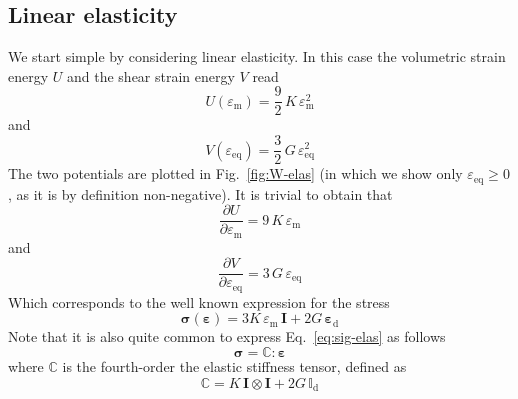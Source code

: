 \documentclass[times,namecite]{goose-article}
\begin{document}
\subsection{Linear elasticity}

We start simple by considering linear elasticity. In this case the volumetric strain energy $U$ and the shear strain energy $V$ read
\begin{equation}\label{eq:U}
  U ( \varepsilon_\mathrm{m}  ) = \frac{9}{2} \, K \, \varepsilon_\mathrm{m}^2
\end{equation}
and
\begin{equation}\label{eq:V-elas}
  V ( \varepsilon_\mathrm{eq} ) = \frac{3}{2} \, G \, \varepsilon_\mathrm{eq}^2
\end{equation}
The two potentials are plotted in Fig.~\ref{fig:W-elas} (in which we show only $\varepsilon_\mathrm{eq} \geq 0$, as it is by definition non-negative). It is trivial to obtain that
\begin{equation}
  \frac{\partial U}{\partial \varepsilon_\mathrm{m}}
  =
  9 \, K \, \varepsilon_\mathrm{m}
\end{equation}
and
\begin{equation}
  \frac{\partial V}{\partial \varepsilon_\mathrm{eq}}
  =
  3 \, G \, \varepsilon_\mathrm{eq}
\end{equation}
Which corresponds to the well known expression for the stress
\begin{equation}\label{eq:sig-elas}
  \bm{\sigma} ( \bm{\varepsilon} )
  =
  3 K \, \varepsilon_\mathrm{m} \, \bm{I}
  +
  2 G \, \bm{\varepsilon}_\mathrm{d}
\end{equation}
Note that it is also quite common to express Eq.~\eqref{eq:sig-elas} as follows
\begin{equation}
  \bm{\sigma} = \mathbb{C} : \bm{\varepsilon}
\end{equation}
where $\mathbb{C}$ is the fourth-order the elastic stiffness tensor, defined as
\begin{equation}
  \mathbb{C} = K \, \bm{I} \otimes \bm{I} + 2 G \, \mathbb{I}_\mathrm{d}
\end{equation}
\end{document}
